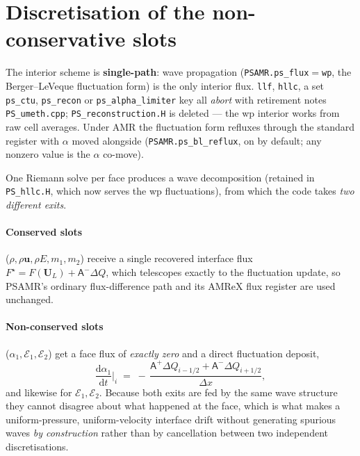 \documentclass[11pt,a4paper]{article}
\newcommand{\uvec}{\mathbf{u}}
\newcommand{\code}[1]{\texttt{\small #1}}
\newcommand{\src}[1]{{\color{gray}\code{#1}}}
\begin{document}
\section{Discretisation of the non-conservative slots}
\label{sec:disc}

The interior scheme is \textbf{single-path}: wave
propagation (\code{PSAMR.ps\_flux}$=$\code{wp}, the Berger--LeVeque
fluctuation form) is the only interior flux.  \code{llf}, \code{hllc}, a
set \code{ps\_ctu}, \code{ps\_recon} or \code{ps\_alpha\_limiter} key all
\emph{abort} with retirement notes \src{PS\_umeth.cpp};
\code{PS\_reconstruction.H} is deleted --- the wp interior works from raw
cell averages.  Under AMR the fluctuation form refluxes through the
standard register with $\alpha$ moved alongside
(\code{PSAMR.ps\_bl\_reflux}, on by default; any nonzero value is the $\alpha$ co-move).

One Riemann solve per face produces a wave decomposition (retained in
\code{PS\_hllc.H}, which now serves the wp fluctuations), from which the
code takes \emph{two different exits}.

\paragraph{Conserved slots} ($\rho,\rho\uvec,\rho E,m_1,m_2$) receive a single
recovered interface flux $F^\star = F(\mathbf{U}_L) + \mathsf{A}^-\Delta Q$,
which telescopes exactly to the fluctuation update, so PSAMR's ordinary
flux-difference path and its AMReX flux register are used unchanged.

\paragraph{Non-conserved slots} ($\alpha_1,\mathcal{E}_1,\mathcal{E}_2$) get a
face flux of \emph{exactly zero} and a direct fluctuation deposit,
\begin{equation}
  \frac{\mathrm{d}\alpha_1}{\mathrm{d}t}\Big|_i
   \;=\;-\,\frac{\mathsf{A}^+\Delta Q_{i-1/2}
                + \mathsf{A}^-\Delta Q_{i+1/2}}{\Delta x},
\end{equation}
and likewise for $\mathcal{E}_1,\mathcal{E}_2$.  Because both exits are fed by
the same wave structure they cannot disagree about what happened at the face,
which is what makes a uniform-pressure, uniform-velocity interface drift
without generating spurious waves \emph{by construction} rather than by
cancellation between two independent discretisations.
\end{document}
